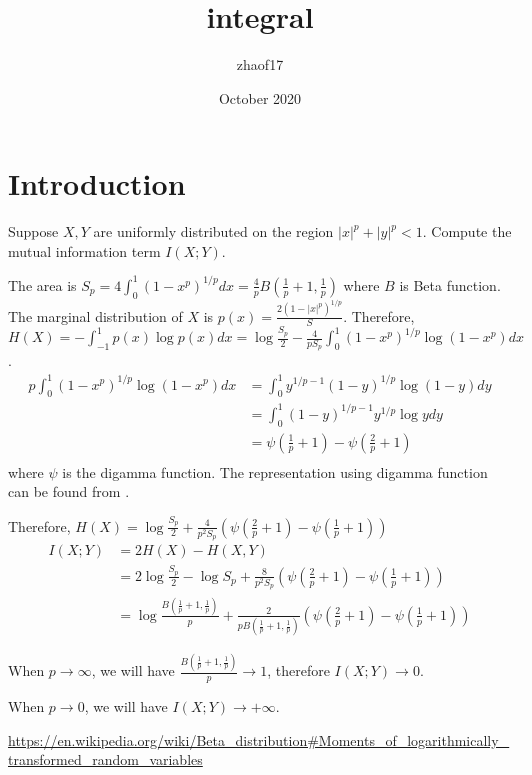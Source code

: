\documentclass{article}
\title{integral}
\author{zhaof17 }
\date{October 2020}
\begin{document}
\maketitle

\section{Introduction}
Suppose $X, Y$ are uniformly distributed on the region
$|x|^p + |y|^p < 1$. Compute the mutual information term
$I(X;Y)$.

The area is $S_p = 4\int_0^1 (1-x^p)^{1/p} dx = \frac{4}{p} B(\frac{1}{p} +1, \frac{1}{p})$ where $B$ is Beta function.
The marginal distribution of $X$ is $p(x) = \frac{2(1-|x|^p)^{1/p}}{S}$. Therefore,
$H(X) = -\int_{-1}^1 p(x) \log p(x)dx = \log \frac{S_p}{2} - \frac{4}{p S_p}\int_0^1 (1-x^p)^{1/p}\log(1-x^p)dx$.
\begin{align*}
    p\int_0^1 (1-x^p)^{1/p}\log(1-x^p)dx
    &=  \int_0^1 y^{1/p-1} (1-y)^{1/p} \log(1-y) dy\\
    &= \int_0^1 (1-y)^{1/p-1} y^{1/p} \log y dy \\
    &= \psi(\frac{1}{p} +1) - \psi(\frac{2}{p}+1) \\
\end{align*}
where $\psi$ is the digamma function. The representation using
digamma function
can be found from \cite{wiki}.

Therefore,
$H(X) = \log \frac{S_p}{2} + \frac{4}{p^2 S_p}(\psi(\frac{2}{p} +1) - \psi(\frac{1}{p}+1))$
\begin{align*}
I(X;Y) &= 2H(X) - H(X,Y) \\
&= 2\log \frac{S_p}{2} - \log S_p + \frac{8}{p^2 S_p}(\psi(\frac{2}{p} +1) - \psi(\frac{1}{p}+1)) \\
&=\log\frac{B(\frac{1}{p}+1, \frac{1}{p})}{p}
+\frac{2}{pB(\frac{1}{p}+1, \frac{1}{p})}(\psi(\frac{2}{p} +1) - \psi(\frac{1}{p}+1)) 
\end{align*}

When $p \to \infty$, we will have
$\frac{B(\frac{1}{p}+1, \frac{1}{p})}{p} \to 1$, therefore $I(X;Y)\to 0$.

When $p \to 0$, we will have $I(X;Y) \to +\infty$.

\begin{thebibliography}{9}
 \url{https://en.wikipedia.org/wiki/Beta_distribution#Moments_of_logarithmically_transformed_random_variables}

\end{thebibliography}
\end{document}
